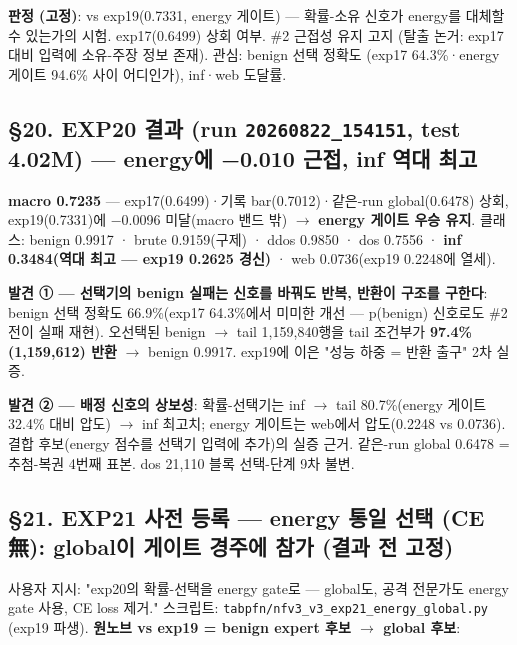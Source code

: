 \textbf{판정 (고정)}: vs exp19(0.7331, energy 게이트) — 확률-소유 신호가 energy를 대체할 수 있는가의 시험. exp17(0.6499) 상회 여부. \#2 근접성 유지 고지 (탈출 논거: exp17 대비 입력에 소유-주장 정보 존재). 관심: benign 선택 정확도 (exp17 64.3\%·energy 게이트 94.6\% 사이 어디인가), inf·web 도달률.

\subsection{§20. EXP20 결과 (run \texttt{20260822\allowbreak{}\_\allowbreak{}\allowbreak{}154151}, test 4.02M) — energy에 −0.010 근접, inf 역대 최고}
\textbf{macro 0.7235} — exp17(0.6499)·기록 bar(0.7012)·같은-run global(0.6478) 상회, exp19(0.7331)에 −0.0096 미달(macro 밴드 밖)  \ensuremath{\rightarrow}  \textbf{energy 게이트 우승 유지}. 클래스: benign 0.9917 · brute 0.9159(구제) · ddos 0.9850 · dos 0.7556 · \textbf{inf 0.3484(역대 최고 — exp19 0.2625 경신)} · web 0.0736(exp19 0.2248에 열세).

\textbf{발견 ① — 선택기의 benign 실패는 신호를 바꿔도 반복, 반환이 구조를 구한다}: benign 선택 정확도 66.9\%(exp17 64.3\%에서 미미한 개선 — p(benign) 신호로도 \#2 전이 실패 재현). 오선택된 benign \ensuremath{\rightarrow} tail 1,159,840행을 tail 조건부가 \textbf{97.4\%(1,159,612) 반환}  \ensuremath{\rightarrow}  benign 0.9917. exp19에 이은 "성능 하중 =\allowbreak{} 반환 출구" 2차 실증.

\textbf{발견 ② — 배정 신호의 상보성}: 확률-선택기는 inf \ensuremath{\rightarrow} tail 80.7\%(energy 게이트 32.4\% 대비 압도)  \ensuremath{\rightarrow}  inf 최고치; energy 게이트는 web에서 압도(0.2248 vs 0.0736). 결합 후보(energy 점수를 선택기 입력에 추가)의 실증 근거. 같은-run global 0.6478 =\allowbreak{} 추첨-복권 4번째 표본. dos 21,110 블록 선택-단계 9차 불변.

\subsection{§21. EXP21 사전 등록 — energy 통일 선택 (CE 無): global이 게이트 경주에 참가 (결과 전 고정)}
사용자 지시: "exp20의 확률-선택을 energy gate로 — global도, 공격 전문가도 energy gate 사용, CE loss 제거." 스크립트: \texttt{tabpfn/\allowbreak{}\allowbreak{}n\allowbreak{}fv3\_\allowbreak{}\allowbreak{}v3\_\allowbreak{}\allowbreak{}e\allowbreak{}xp21\_\allowbreak{}\allowbreak{}ene\allowbreak{}rgy\_\allowbreak{}\allowbreak{}glob\allowbreak{}al.\allowbreak{}py} (exp19 파생). \textbf{원노브 vs exp19 =\allowbreak{} benign expert 후보  \ensuremath{\rightarrow}  global 후보}:

